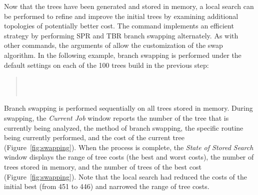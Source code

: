{Now that the trees have been generated and stored in memory, a local search can be performed to refine and improve the initial trees by examining additional topologies of potentially better cost.  The command  implements an efficient strategy by performing SPR and TBR branch swapping alternately. As with other commands, the arguments of  allow the customization of the swap algorithm. In the following example, branch swapping is performed under the default settings on each of the 100 trees build in the previous step:

\begin{quote}
 	\\
 	\\
\end{quote}

Branch swapping is performed sequentially on all trees stored in memory. During swapping, the \emph{Current Job} window reports the number of the tree that is currently being analyzed, the method of branch swapping, the specific routine being currently performed, and the cost of the current tree (Figure~\ref{fig:swapping}). When the process is complete, the \emph{State of Stored Search} window displays the range of tree costs (the best and worst costs), the number of trees stored in memory, and the number of trees of the best cost (Figure~\ref{fig:swapping}). Note that the local search had reduced the costs of the initial best (from 451 to 446) and narrowed the range of tree costs.

}

